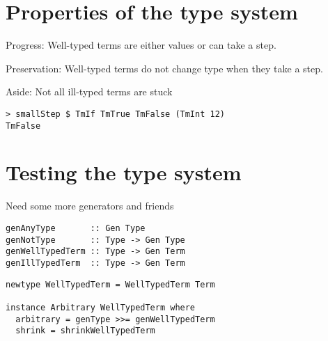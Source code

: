 \documentclass[aspectration=169]{beamer}
\begin{document}
\section{Properties of the type system}

\begin{frame}[c]
  \begin{center}
    Progress: Well-typed terms are either values or can take a step.
  \end{center}
\end{frame}

\begin{frame}[c]
  \begin{center}
    Preservation: Well-typed terms do not change type when they take a step.
  \end{center}
\end{frame}

\begin{frame}[fragile,c]
  \begin{center}
    Aside: Not all ill-typed terms are stuck
  \end{center}
  \begin{verbatim}
> smallStep $ TmIf TmTrue TmFalse (TmInt 12)
TmFalse
  \end{verbatim}
\end{frame}

\section{Testing the type system}

\begin{frame}[fragile]
  \begin{center}
  Need some more generators and friends
  \end{center}
  \begin{verbatim}
genAnyType       :: Gen Type
genNotType       :: Type -> Gen Type
genWellTypedTerm :: Type -> Gen Term
genIllTypedTerm  :: Type -> Gen Term
  \end{verbatim}
\end{frame}

\begin{frame}[fragile]
  \begin{verbatim}
newtype WellTypedTerm = WellTypedTerm Term

instance Arbitrary WellTypedTerm where
  arbitrary = genType >>= genWellTypedTerm
  shrink = shrinkWellTypedTerm
  \end{verbatim}
\end{frame}
\end{document}
